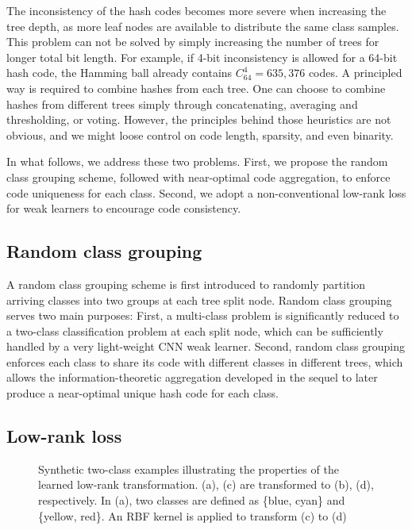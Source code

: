 \documentclass[runningheads]{llncs}
\begin{document}
The inconsistency of the hash codes becomes more severe when increasing the tree
depth, as more leaf nodes are available to distribute the same class
samples. This problem can not be solved by simply increasing the number of trees
for longer total bit length. For example, if 4-bit inconsistency is allowed for
a 64-bit hash code, the Hamming ball already contains $ C_{64}^4= 635,376$
codes.  A principled way is required to combine hashes from each tree. One can
choose to combine hashes from different trees simply through concatenating,
averaging and thresholding, or voting. However, the principles behind those
heuristics are not obvious, and we might loose control on code length, sparsity,
and even binarity.

In what follows, we address these two problems. First, we propose the random class
grouping scheme, followed with near-optimal code aggregation, to enforce code
uniqueness for each class. Second, we adopt a non-conventional low-rank loss for
weak learners to encourage code consistency.


\subsection{Random class grouping} \label{sec:grouping}
A random class grouping scheme is first introduced to randomly partition
arriving classes into two groups at each tree split node. Random class grouping
serves two main purposes: First, a multi-class problem is significantly reduced
to a two-class classification problem at each split node, which can be
sufficiently handled by a very light-weight CNN weak learner.  Second, random class
grouping enforces each class to share its code with different classes in different
trees, which allows the information-theoretic aggregation developed in the
sequel to later produce a near-optimal unique hash code for each class.


\subsection{Low-rank loss}
\label{sec:trans}

\begin{figure*}[t]
  \centering
  \caption{Synthetic two-class examples illustrating the properties of the
    learned low-rank transformation. (a), (c) are transformed to (b), (d),
    respectively. In (a), two classes are defined as \{blue, cyan\} and
    \{yellow, red\}. An RBF kernel is applied to transform (c) to (d)}
  \label{fig:toyexample}
\end{figure*}
\end{document}

